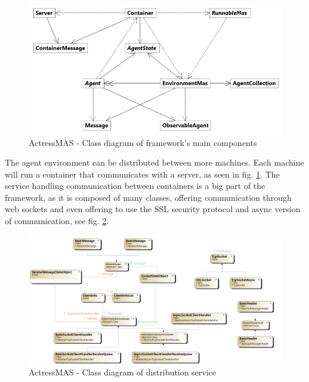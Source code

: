 \documentclass[0main.tex]{subfiles}
\begin{document}
\begin{figure}[htbp]
    \centering
    \includegraphics[width=.9\textwidth]{actress-environment2.png}
    \caption{ActressMAS - Class diagram of framework's main components \cite{Leon2022}}
    \label{actress-env}
\end{figure}

The agent environment can be distributed between more machines. Each machine will run a container that communicates with a 
server, as seen in fig. \ref{actress-env}. The service handling communication between containers is a big part of the 
framework, as it is composed of many classes, offering communication through web sockets and even offering to 
use the SSL security protocol and async version of communication, see fig. \ref{actress-distr}.

\begin{figure}[htbp]
    \centering
    \includegraphics[width=.99\textwidth]{ClassDiagram-actress-containers.png}
    \caption{ActressMAS - Class diagram of distribution service \cite{Leon2022}}
    \label{actress-distr}
\end{figure}
\end{document}
